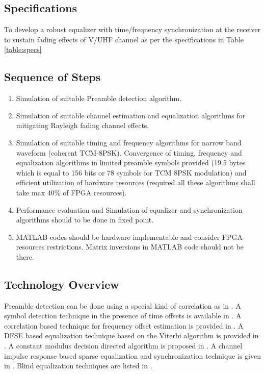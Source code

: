 \subsection{Specifications}
To develop a robust equalizer with time/frequency synchronization at the receiver to  sustain fading effects of
V/UHF channel as per the  specifications in Table \ref{table:specs}
\begin{table}
\centering

\caption{}
\label{table:specs}
\end{table}
\subsection{Sequence of Steps}
\begin{enumerate}

\item Simulation of suitable Preamble detection algorithm.
\item Simulation of suitable channel estimation and equalization algorithms for mitigating Rayleigh fading channel effects.
\item  Simulation of suitable timing and frequency algorithms for narrow band waveform (coherent TCM-8PSK). Convergence of timing, frequency and equalization algorithms in limited preamble symbols provided (19.5 bytes which is equal to 156 bits or 78 symbols for  TCM 8PSK modulation) and efficient utilization of hardware resources (required all these algorithms shall take max 40\% of FPGA resources).
\item Performance evaluation and Simulation of equalizer and synchronization algorithms should to be done in fixed point.
\item MATLAB codes should be hardware implementable and consider FPGA resources restrictions. Matrix inversions in MATLAB code should not be there.

\end{enumerate}
\subsection{Technology Overview}
Preamble detection can be done using a special kind of correlation as in \cite{frame_offset}.  A symbol detection technique in the presence of time offsets is available in \cite{time_offset}.  A correlation based technique for frequency offset estimation is provided in \cite{freq_offset}. A DFSE based equalization technique based on the Viterbi algorithm is provided in \cite{dfse_viterbi}. A constant modulus decision directed algorithm is proposed in \cite{cmdd}. A channel impulse response based sparse equalization and synchronization technique is given in \cite{cir_sparse}.  Blind equalization techniques are listed in \cite{blind}.

